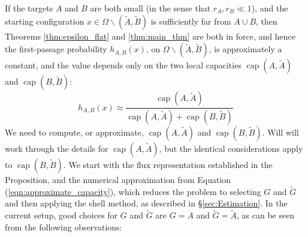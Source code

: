 \documentclass[12pt, nofootinbib,english, amsmath, amssymb, aps, priprint, graphicx,floatfix]{revtex4-1}
\theoremstyle{plain}
\theoremstyle{definition}
\theoremstyle{plain}
\newcommand{\capac}[2]{\ensuremath{\operatorname{cap}}(#1,#2)}
\newcommand{\dA}{{\dot A}}
\newcommand{\tA}{{\tilde A}}
\newcommand{\tB}{{\tilde B}}
\begin{document}
If the targets $A$ and $B$ are both small (in the sense that $r_A,r_B \ll 1$), and the starting configuration $x\in\Omega\backslash(\tA,\tB)$ is sufficiently far from $A\cup B$, then Theorems \ref{thm:epsilon_flat} and \ref{thm:main_thm} are both in force, and hence the first-passage probability $h_{A,B}(x)$, on $\Omega\backslash(\tA,\tB)$, is approximately a constant, and the value depends only on the two local capacities $\capac{A}{\tA}$ and
$\capac{B}{\tB}$:
\[
 h_{A,B} (x) \approx \frac{\capac{A}{\tilde A}}{\capac{A}{\tilde A}+\capac{B}{\tilde B}}
 \]
We need to compute, or approximate, $\capac{A}{\tA}$ and $\capac{B}{\tB}$. Will will work through the details for $\capac{A}{\tA}$, but the identical considerations apply to 
$\capac{B}{\tilde B}$.  We start with the flux representation
established in the Proposition, and the numerical approximation from Equation (\ref{eqn:approximate_capacity}), which reduces the problem to selecting $G$ and $\tilde G$ and then applying the shell method, as described in \S\ref{sec:Estimation}.
In the current setup, 
good choices for $G$ and $\tilde G$ are $G=\dA$ and 
$\tilde G = \tA$, as can be seen from the following observations:
\end{document}
